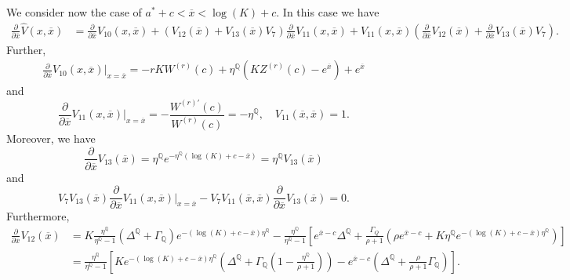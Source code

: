 \documentclass[10pt]{amsart}
\def\Q{{\mathbb{Q}}}
\begin{document}
		
		We consider now the case of $a^*+c < \overline{x} < \log(K) + c$. In this case we have
		\begin{align*}
			\frac{\partial}{\partial \overline{x}} \hat{V}(x, \overline{x}) &= \frac{\partial}{\partial \overline{x}} V_{10}(x, \overline{x}) + (V_{12}(\overline{x}) + V_{13}(\overline{x})V_7)\frac{\partial}{\partial \overline{x}} V_{11}(x, \overline{x}) + V_{11}(x, \overline{x})\left(\frac{\partial}{\partial \overline{x}}V_{12}(\overline{x}) + 	\frac{\partial}{\partial \overline{x}}V_{13}(\overline{x})V_7\right).
		\end{align*}		
		Further,
		\begin{align*}
			\frac{\partial}{\partial \overline{x}} V_{10}(x, \overline{x})\big|_{x = \overline{x}} = -rKW^{(r)}(c) + \eta^\Q \left( KZ^{(r)}(c) - e^{\overline{x}} \right) + e^{\overline{x}}
		\end{align*}
		and
		\begin{equation*}
			\frac{\partial}{\partial \overline{x}} V_{11}(x, \overline{x})\big|_{x = \overline{x}} = - \frac{W^{(r)'}(c)}{W^{(r)}(c)} = -\eta^\Q, \quad V_{11}(\overline{x}, \overline{x}) = 1.
		\end{equation*}
		Moreover, we have
		\begin{equation*}
			\frac{\partial}{\partial \overline{x}}V_{13}(\overline{x}) = \eta^\Q e^{-\eta^\Q (\log(K) + c - \overline{x})} = \eta^\Q V_{13}(\overline{x})
		\end{equation*}
		and
		\begin{equation*}
			V_7 V_{13}(\overline{x})\frac{\partial}{\partial \overline{x}} V_{11}(x, \overline{x})\big|_{x = \overline{x}} -  V_7V_{11}(\overline{x}, \overline{x})\frac{\partial}{\partial \overline{x}}V_{13}(\overline{x}) = 0.
		\end{equation*}
		Furthermore,		
		\begin{align*}
			\frac{\partial}{\partial \overline{x}}V_{12}(\overline{x}) &= K\frac{\eta^\Q}{\eta^\Q-1}\left( \Delta^\Q + \Gamma_\Q \right)e^{-(\log(K)+c-\overline{x})\eta^\Q}   - \frac{\eta^\Q}{\eta^\Q-1}\left[ e^{\overline{x}-c}\Delta^\Q + \frac{\Gamma_Q}{\rho+1}\left( \rho e^{\overline{x}-c} +  K\eta^\Q e^{-(\log(K)+c-\overline{x})\eta^\Q} \right)  \right]
			\\
			\nonumber & = \frac{\eta^\Q}{\eta^\Q-1} \left[ Ke^{-(\log(K)+c-\overline{x})\eta^\Q}\left( \Delta^\Q + \Gamma_\Q\left( 1 - \frac{\eta^\Q}{\rho+1} \right) \right) - e^{\overline{x}-c}\left( \Delta^\Q + \frac{\rho}{\rho+1}\Gamma_\Q \right) \right].
		\end{align*}
\end{document}
